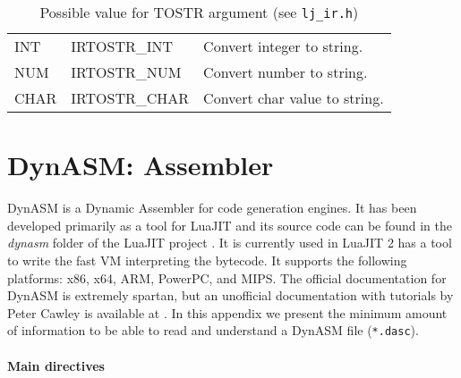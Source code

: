 \begin{table}[H]
\centering
\caption{
  Possible value for TOSTR argument (see \texttt{lj\_ir.h})
}
\label{tab:dump-tostr}
\begin{tabular}{|l|l|l|}
\hline
INT  & IRTOSTR\_INT  & Convert integer to string.  \\
NUM  & IRTOSTR\_NUM  & Convert number to string.  \\
CHAR & IRTOSTR\_CHAR & Convert char value to string.  \\\hline
\end{tabular}
\end{table}






















\chapter{DynASM: Assembler}
\label{Apendix:DynASM}

DynASM \cite{pall2012dynasm} is a Dynamic Assembler for code generation engines. It has been developed
primarily as a tool for LuaJIT and its source code can be found in the \textit{dynasm}
folder of the LuaJIT project \cite{luajit-src}. It is currently used in LuaJIT
2 has a tool to write the fast VM interpreting the bytecode. It supports the
following platforms: x86, x64, ARM, PowerPC, and MIPS. The official documentation for DynASM \cite{pall2012dynasm} is extremely spartan, but an unofficial
documentation with tutorials by Peter Cawley is available at \cite{cawleydynasm}. In this appendix we present the minimum amount of information to be able to read and understand a DynASM file (\texttt{*.dasc}).


\subsubsection{Main directives}

